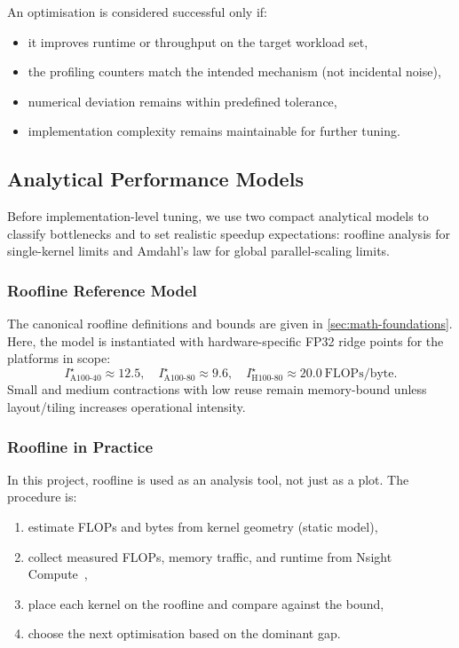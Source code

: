 An optimisation is considered successful only if:

\begin{itemize}
  \item it improves runtime or throughput on the target workload set,
  \item the profiling counters match the intended mechanism (not incidental
    noise),
  \item numerical deviation remains within predefined tolerance,
  \item implementation complexity remains maintainable for further tuning.
\end{itemize}

\subsection{Analytical Performance Models}\label{sec:analytical-models}

Before implementation-level tuning, we use two compact analytical
models to classify bottlenecks and to set realistic speedup expectations:
roofline analysis for single-kernel limits and Amdahl's law for global
parallel-scaling limits.

\subsubsection{Roofline Reference Model}\label{sec:roofline-model}

The canonical roofline definitions and bounds are given in
\cref{sec:math-foundations}. Here, the model is instantiated with
hardware-specific FP32 ridge points for the platforms in scope:
\[
  I^\star_{\mathrm{A100\mbox{-}40}} \approx 12.5,\quad
  I^\star_{\mathrm{A100\mbox{-}80}} \approx 9.6,\quad
  I^\star_{\mathrm{H100\mbox{-}80}} \approx 20.0
  \ \text{FLOPs/byte}.
\]
Small and medium contractions with low reuse remain memory-bound unless
layout/tiling increases operational intensity.

\subsubsection{Roofline in Practice}\label{sec:roofline-in-practice}

In this project, roofline is used as an analysis tool, not just as a plot.
The procedure is:
\begin{enumerate}
  \item estimate FLOPs and bytes from kernel geometry (static model),
  \item collect measured FLOPs, memory traffic, and runtime from Nsight
    Compute~\cite{nvidia-nsight-compute-profiling-guide},
  \item place each kernel on the roofline and compare against the bound,
  \item choose the next optimisation based on the dominant gap.
\end{enumerate}

